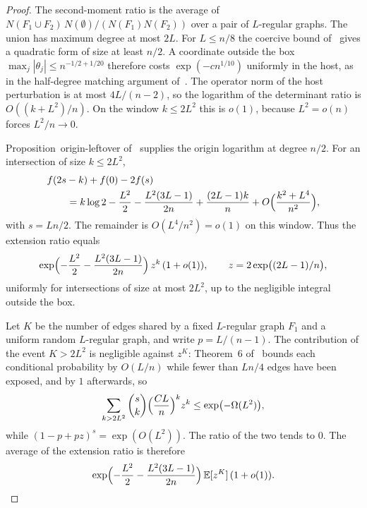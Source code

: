 \documentclass[11pt]{article}
\newcommand{\EE}{\mathbb{E}}
\begin{document}
\begin{proof}
The second-moment ratio is the average of
\(N(F_1\cup F_2)\,N(\emptyset)/(N(F_1)N(F_2))\) over a pair of \(L\)-regular
graphs. The union has maximum degree at most \(2L\). For \(L\le n/8\) the
coercive bound of~\cite{PlusOneV1} gives a quadratic form of size at least
\(n/2\). A coordinate outside the box \(\max_j|\theta_j|\le n^{-1/2+1/20}\)
therefore costs \(\exp(-c n^{1/10})\) uniformly in the host, as in the
half-degree matching argument of~\cite{PlusOneV1}. The operator norm of the
host perturbation is at most \(4L/(n-2)\), so the logarithm of the
determinant ratio is \(O((k+L^2)/n)\). On the window \(k\le 2L^2\) this is
\(o(1)\), because \(L^2=o(n)\) forces \(L^2/n\to 0\).

Proposition~origin-leftover of~\cite{PlusOneV1} supplies the origin logarithm
at degree \(n/2\). For an intersection of size \(k\le 2L^2\),
\[
\begin{aligned}
&f(2s-k)+f(0)-2f(s)\\
&\qquad=
k\log 2-\frac{L^2}{2}-\frac{L^2(3L-1)}{2n}+\frac{(2L-1)k}{n}
+O\Bigl(\frac{k^2+L^4}{n^2}\Bigr),
\end{aligned}
\]
with \(s=Ln/2\). The remainder is \(O(L^4/n^2)=o(1)\) on this window.
Thus the extension ratio equals
\[
\exp\Bigl(-\frac{L^2}{2}-\frac{L^2(3L-1)}{2n}\Bigr)\,z^k\,(1+o(1)),
\qquad
z=2\exp\bigl((2L-1)/n\bigr),
\]
uniformly for intersections of size at most \(2L^2\), up to the negligible
integral outside the box.

Let \(K\) be the number of edges shared by a fixed \(L\)-regular graph \(F_1\)
and a uniform random \(L\)-regular graph, and write \(p=L/(n-1)\).
The contribution of the event \(K>2L^2\) is negligible against \(z^K\):
Theorem~6 of~\cite{Gao20} bounds each conditional probability by \(O(L/n)\)
while fewer than \(Ln/4\) edges have been exposed, and by \(1\) afterwards, so
\[
\sum_{k>2L^2}\binom{s}{k}\Bigl(\frac{CL}{n}\Bigr)^k z^k
\le\exp\bigl(-\Omega(L^2)\bigr),
\]
while \((1-p+pz)^s=\exp(O(L^2))\). The ratio of the two tends to \(0\).
The average of the extension ratio is therefore
\[
\exp\Bigl(-\frac{L^2}{2}-\frac{L^2(3L-1)}{2n}\Bigr)\,\EE[z^K]\,(1+o(1)).
\]


\end{proof}
\end{document}
